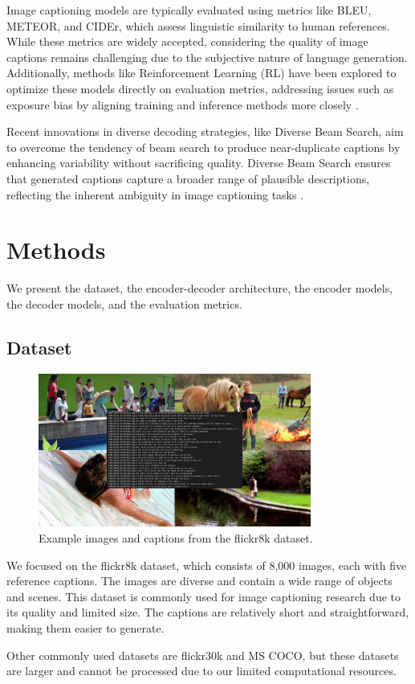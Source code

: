 \documentclass[12pt]{article}
\theoremstyle{plain}
\theoremstyle{definition}
\theoremstyle{remark}
\begin{document}
Image captioning models are typically evaluated using metrics like BLEU, METEOR, and CIDEr, which assess linguistic similarity to human references. While these metrics are widely accepted, considering the quality of image captions remains challenging due to the subjective nature of language generation. Additionally, methods like Reinforcement Learning (RL) have been explored to optimize these models directly on evaluation metrics, addressing issues such as exposure bias by aligning training and inference methods more closely \cite{Rennie}.

Recent innovations in diverse decoding strategies, like Diverse Beam Search, aim to overcome the tendency of beam search to produce near-duplicate captions by enhancing variability without sacrificing quality. Diverse Beam Search ensures that generated captions capture a broader range of plausible descriptions, reflecting the inherent ambiguity in image captioning tasks \cite{Vijayakumar}.



\section{Methods}
\label{sec:methods}

We present the dataset, the encoder-decoder architecture, the encoder models, the decoder models, and the evaluation metrics.

\subsection{Dataset}
\begin{figure}[H]
    \centering
    \includegraphics[width=0.8\textwidth]{src/flickr8k.png}
    \caption{Example images and captions from the flickr8k dataset.}
    \label{fig:flickr8k}
\end{figure}
We focused on the flickr8k dataset, which consists of 8,000 images, each with five reference captions. The images are diverse and contain a wide range of objects and scenes. This dataset is commonly used for image captioning research due to its quality and limited size. The captions are relatively short and straightforward, making them easier to generate.
\par Other commonly used datasets are flickr30k and MS COCO, but these datasets are larger and cannot be processed due to our limited computational resources.
\end{document}
